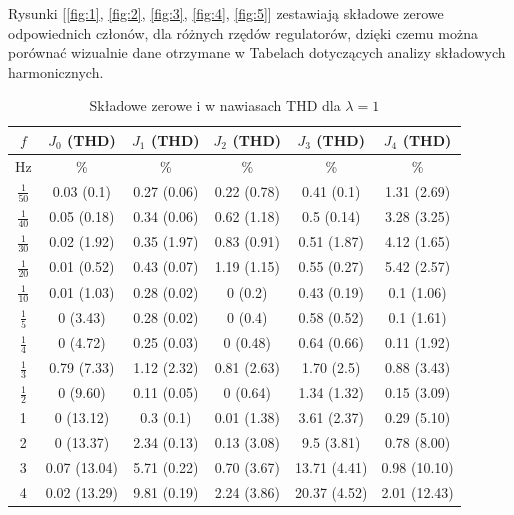 \documentclass[journal,twoside,web]{ieeecolor}
\begin{document}
Rysunki [\ref{fig:1}, \ref{fig:2}, \ref{fig:3}, \ref{fig:4}, \ref{fig:5}] zestawiają składowe zerowe odpowiednich członów, dla różnych rzędów regulatorów, dzięki czemu można porównać wizualnie dane otrzymane w Tabelach dotyczących analizy składowych harmonicznych. 
\begin{table}[h!]
	\centering
	\renewcommand{\arraystretch}{1.2}
	\caption{Składowe zerowe i w nawiasach THD dla $\lambda = 1$}
	\setlength{\tabcolsep}{6pt}
	\begin{tabular}{|c|c|c|c|c|c|}
		\hline
		$f$              & $J_0$ (THD)       & $J_1$ (THD)       & $J_2$ (THD)            & $J_3$ (THD)       & $J_4$ (THD)       \\ \hline
		Hz & \% & \% & \% & \% & \% \\ \hline
		\(\frac{1}{50}\) & 0.03 (0.1)      & 0.27 (0.06) & 0.22 (0.78) & 0.41 (0.1)       & 1.31 (2.69)      \\ \hline
		\(\frac{1}{40}\) & 0.05 (0.18)     & 0.34 (0.06) & 0.62 (1.18)  & 0.5 (0.14)       & 3.28 (3.25)      \\ \hline
		\(\frac{1}{30}\) & 0.02 (1.92)     & 0.35 (1.97) & 0.83 (0.91)& 0.51 (1.87)      & 4.12 (1.65)      \\ \hline
		\(\frac{1}{20}\) & 0.01 (0.52)     & 0.43 (0.07) & 1.19 (1.15) & 0.55 (0.27)      & 5.42 (2.57)      \\ \hline
		\(\frac{1}{10}\) & 0.01 (1.03)     & 0.28 (0.02)  & 0 (0.2)  & 0.43 (0.19)      & 0.1 (1.06)       \\ \hline
		\(\frac{1}{5}\)  & 0 (3.43)        & 0.28 (0.02) & 0 (0.4)  & 0.58 (0.52) & 0.1 (1.61) 
	    \\ \hline
		\(\frac{1}{4}\)  & 0 (4.72)        & 0.25 (0.03) & 0 (0.48)  & 0.64 (0.66)      & 0.11 (1.92)      \\ \hline
		\(\frac{1}{3}\)  & 0.79 (7.33)     & 1.12 (2.32)  & 0.81 (2.63)  & 1.70 (2.5)   & 0.88 (3.43)      \\ \hline
		\(\frac{1}{2}\)  & 0 (9.60)        & 0.11 (0.05)  & 0 (0.64)  & 1.34 (1.32)      & 0.15 (3.09)      \\ \hline
		1                & 0 (13.12)      & 0.3 (0.1)  & 0.01 (1.38)  & 3.61 (2.37)     & 0.29 (5.10)     \\ \hline
		2                & 0 (13.37)      & 2.34 (0.13)  & 0.13 (3.08) & 9.5 (3.81)      & 0.78 (8.00)     \\ \hline
		3         & 0.07 (13.04)   & 5.71 (0.22)     & 0.70 (3.67)     & 13.71 (4.41)    & 0.98 (10.10)    \\ \hline
		4         & 0.02 (13.29)   & 9.81 (0.19)     & 2.24 (3.86)     & 20.37 (4.52)    & 2.01 (12.43)    \\ \hline
	\end{tabular}
	
	\label{tab:THDL1}
\end{table}
\end{document}
